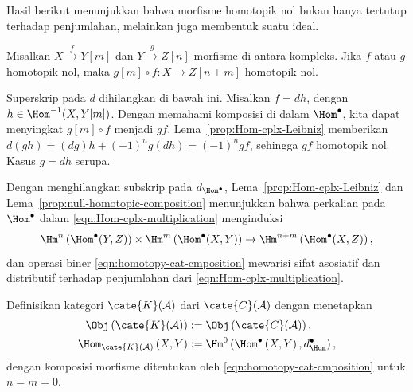 Hasil berikut menunjukkan bahwa morfisme homotopik nol bukan hanya tertutup
terhadap penjumlahan, melainkan juga membentuk suatu ideal.

\begin{lema}\label{prop:null-homotopic-composition}
	Misalkan $X\xrightarrow{f}Y[m]$ dan $Y\xrightarrow{g}Z[n]$ morfisme di
	antara kompleks. Jika $f$ atau $g$ homotopik nol, maka
	$g[m]\circ f:X\to Z[n+m]$ homotopik nol.
\end{lema}
\begin{bukti}
	Superskrip pada $d$ dihilangkan di bawah ini. Misalkan $f=dh$, dengan
	$h\in\Hom^{-1}(X,Y[m])$. Dengan memahami komposisi di dalam
	$\Hom^\bullet$, kita dapat menyingkat $g[m]\circ f$ menjadi $gf$.
	Lema~\ref{prop:Hom-cplx-Leibniz} memberikan
	$d(gh)=(dg)h+(-1)^ng(dh)=(-1)^ngf$, sehingga $gf$ homotopik nol. Kasus
	$g=dh$ serupa.
\end{bukti}

Dengan menghilangkan subskrip pada $d_{\Hom^\bullet}$,
Lema~\ref{prop:Hom-cplx-Leibniz} dan
Lema~\ref{prop:null-homotopic-composition} menunjukkan bahwa perkalian pada
$\Hom^\bullet$ dalam \eqref{eqn:Hom-cplx-multiplication} menginduksi
\begin{equation}\label{eqn:homotopy-cat-cmposition}
	\Hm^n\left(\Hom^\bullet(Y, Z) \right) \times \Hm^m\left(\Hom^\bullet(X, Y) \right) \to \Hm^{n+m}\left( \Hom^\bullet(X, Z) \right) ,
\end{equation}
dan operasi biner \eqref{eqn:homotopy-cat-cmposition} mewarisi sifat asosiatif
dan distributif terhadap penjumlahan dari
\eqref{eqn:Hom-cplx-multiplication}.

\begin{definisi}\label{def:cplx-homotopy-cat}
	Definisikan kategori $\cate{K}(\mathcal{A})$ dari
	$\cate{C}(\mathcal{A})$ dengan menetapkan
	\begin{align*}
		\Obj\left( \cate{K}(\mathcal{A}) \right) & := \Obj\left( \cate{C}(\mathcal{A}) \right), \\
		\Hom_{\cate{K}(\mathcal{A})}\left( X, Y \right) & := \Hm^0\left( \Hom^\bullet\left( X, Y \right), d^\bullet_{\Hom} \right),
	\end{align*}
	dengan komposisi morfisme ditentukan oleh
	\eqref{eqn:homotopy-cat-cmposition} untuk $n=m=0$.
\end{definisi}

